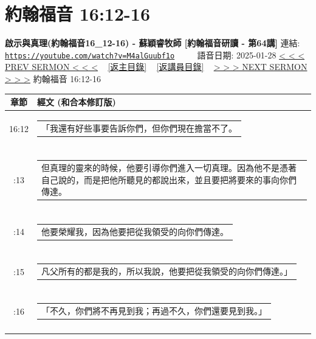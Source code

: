 \documentclass{book}
\begin{document}
\section{約翰福音 16:12-16}
\label{sec:M4alGuubf1o}
\textbf{啟示與真理(約翰福音16\_12-16) - 蘇穎睿牧師 [約翰福音研讀 - 第64講]}
\newline
\newline
連結: \href{https://youtube.com/watch?v=M4alGuubf1o}{\texttt{https://youtube.com/watch?v=M4alGuubf1o}} ~~~~ 語音日期: 2025-01-28
\newline
\newline
\hyperref[sec:pF1FrHKEPww]{< < < PREV SERMON < < <}
~
\hyperlink{toc}{[返主目錄]}
~
\hyperref[ch:preacher11]{[返講員目錄]}
~
\hyperref[sec:HaGDtN4u47U]{> > > NEXT SERMON > > >}
\newline
\newline
約翰福音 16:12-16
\newline
\begin{longtable}{cl}
\hline
\hline
章節 & 經文 (和合本修訂版)\\
\hline
16:12 & \begin{tabularx}{0.7\textwidth}{X} 「我還有好些事要告訴你們，但你們現在擔當不了。 \end{tabularx} \\ \\ \relax
16:13 & \begin{tabularx}{0.7\textwidth}{X} 但真理的靈來的時候，他要引導你們進入一切真理。因為他不是憑著自己說的，而是把他所聽見的都說出來，並且要把將要來的事向你們傳達。 \end{tabularx} \\ \\ \relax
16:14 & \begin{tabularx}{0.7\textwidth}{X} 他要榮耀我，因為他要把從我領受的向你們傳達。 \end{tabularx} \\ \\ \relax
16:15 & \begin{tabularx}{0.7\textwidth}{X} 凡父所有的都是我的，所以我說，他要把從我領受的向你們傳達。」 \end{tabularx} \\ \\ \relax
16:16 & \begin{tabularx}{0.7\textwidth}{X} 「不久，你們將不再見到我；再過不久，你們還要見到我。」 \end{tabularx} \\ \\
[1ex]
\hline
\hline
\end{longtable}
\end{document}

